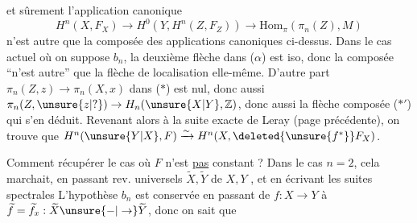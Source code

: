 et sûrement  l'application canonique 
\[
H^n(X,F_X)\to H^0(Y,H^n(Z,F_Z))\to\mathrm{Hom}_\pi(\pi_n(Z),M)
\tag*{($\alpha$)}
\]
n'est autre que la  composée des applications canoniques ci-dessus. Dans le cas actuel où on suppose $b_n$, la deuxième flèche dans ($\alpha$) est iso, donc la composée ``n'est autre'' que la flèche de localisation elle-même.
D'autre part $\pi_n(Z,z)\to\pi_n(X,x)$ dans ($*$) est nul, donc aussi $\pi_n(Z,\unsure{z|?})\to H_n(\unsure{X|Y},\mathbb Z)$, donc aussi la flèche composée ($*'$) qui s'en déduit. Revenant alors à la suite exacte de Leray (page précédente), on trouve que $H^n(\unsure{Y|X},F)\xrightarrow{\sim}H^n(X,\deleted{\unsure{f^*}}F_X)$.

 Comment récupérer le cas où $F$ n'est \uline{pas} constant ? Dans le cas $n=2$, cela marchait,  en passant  rev. universels $\widetilde X,\widetilde Y$ de $X,Y$ , et en écrivant les suites spectrales
L'hypothèse $b_n$ est conservée en passant de $f:X\to Y$ à $\widetilde f=\widetilde f_x:\widetilde X\unsure{-|\to}\widetilde Y$, donc on sait que
